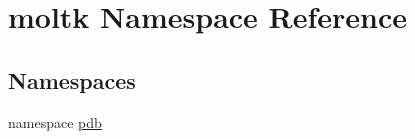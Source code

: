 \hypertarget{namespacemoltk}{
\section{moltk \-Namespace \-Reference}
\label{namespacemoltk}
}
\subsection*{\-Namespaces}
\begin{DoxyCompactItemize}
\item 
namespace \hyperlink{namespacemoltk_1_1pdb}{pdb}
\end{DoxyCompactItemize}
